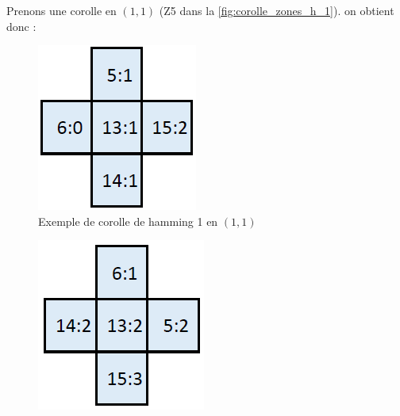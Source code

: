 \begin{exmp}
	Prenons une corolle en $(1,1)$ (Z5 dans la \autoref{fig:corolle_zones_h_1}).
	on obtient donc : \\
	\begin{minipage}{0.24\textwidth}
		\begin{figure}[H]
			\centering
			\includegraphics[width=\linewidth]{images/corolle_ex_orientee}
			\caption{Exemple de corolle de hamming 1 en $(1,1)$}
			\label{fig:corolle_ex_orientee}
		\end{figure}
	\end{minipage}\hfill
	\begin{minipage}{0.24\textwidth}
		\begin{figure}[H]
			\centering
			\includegraphics[width=\linewidth]{images/corolle_ex_orientee_1}

\end{figure}
\end{minipage}
\end{exmp}
